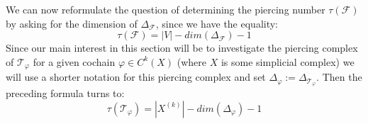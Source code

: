 We can now reformulate the question of determining the piercing number \(\tau(\mathcal{F})\) by asking for the dimension of \(\Delta_{\mathcal{F}}\), since we have the equality:
\[
\tau(\mathcal{F})=\left| V\right|-dim(\Delta_{\mathcal{F}})-1
\]
Since our main interest in this section will be to investigate the piercing complex of \(\mathcal{T}_{\varphi}\) for a given cochain \(\varphi\in C^k(X)\) (where \(X\) is some simplicial complex) we will use a shorter notation for this piercing complex and set \(\Delta_{\varphi}:=\Delta_{\mathcal{T}_{\varphi}}\). Then the preceding formula turns to:
\[
\tau(\mathcal{T}_{\varphi})=|X^{(k)}|-dim(\Delta_{\varphi})-1
\]

%



%      

